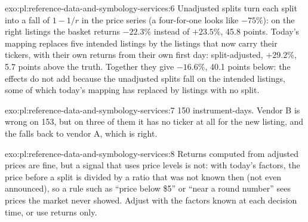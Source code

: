 \begin{solution}{exo:pl:reference-data-and-symbology-services:6}
Unadjusted splits turn each split into a fall of $1 - 1/r$ in the price series (a four-for-one looks like $-75\%$): on the right
listings the basket returns $-22.3\%$ instead of $+23.5\%$, 45.8 points. Today's mapping replaces five intended listings by the
listings that now carry their tickers, with their own returns from their own first day: split-adjusted, $+29.2\%$, 5.7 points
above the truth. Together they give $-16.6\%$, 40.1 points below: the effects do not add because the unadjusted splits fall on
the intended listings, some of which today's mapping has replaced by listings with no split.
\end{solution}

\begin{solution}{exo:pl:reference-data-and-symbology-services:7}
150 instrument-days. Vendor B is wrong on 153, but on three of them it has no ticker at all for the new listing, and the 
falls back to vendor A, which is right.
\end{solution}

\begin{solution}{exo:pl:reference-data-and-symbology-services:8}
Returns computed from adjusted prices are fine, but a signal that uses price levels is not: with today's factors, the price
before a split is divided by a ratio that was not known then (not even announced), so a rule such as ``price below \$5'' or
``near a round number'' sees prices the market never showed. Adjust with the factors known at each decision time, or use
returns only.
\end{solution}

